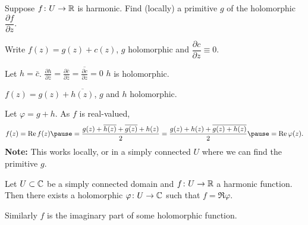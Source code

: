 \documentclass[10pt,aspectratio=169]{beamer}
\begin{document}
\begin{frame}
Suppose $f \colon U \to {\mathbb{R}}$ is harmonic.
\quad
\pause
Find (locally) a primitive $g$ of the holomorphic
$\dfrac{\partial f}{\partial z}$.

\medskip
\pause

Write
\quad $f(z) = g(z) + c(z)$, \quad
$g$ holomorphic and $\dfrac{\partial c}{\partial z} \equiv 0$.

\medskip
\pause

Let $h = \bar{c}$.
\pause
\wthus
$\displaystyle
\frac{\partial h}{\partial \bar{z}}
=
\frac{\partial \bar{c}}{\partial \bar{z}}
=
\overline{
\frac{\partial c}{\partial z}
}
=
0$
\pause
\wthus
$h$ is holomorphic.

\pause
\medskip
\thus \quad
$f(z) = g(z) + \overline{h(z)}$,
\quad
$g$ and $h$ holomorphic.

\medskip
\pause

Let $\varphi = g+h$.
\pause  \quad As $f$ is real-valued,
\[
f(z) = \Re f(z)
\pause
=
\frac{g(z) + \overline{h(z)} + \overline{g(z)}+h(z)}{2}
=
\frac{g(z) + h(z) + \overline{g(z)+h(z)}}{2}
\pause
=
\Re \varphi(z) .
\]
\pause
\textbf{Note:} This works locally, or in a simply
connected $U$ where we can find the primitive $g$.

\pause

\begin{proposition}
Let $U \subset {\mathbb{C}}$ be a simply connected domain and $f \colon U \to {\mathbb{R}}$ a
harmonic function.  Then there exists a holomorphic $\varphi \colon
U \to {\mathbb{C}}$ such that $f = \Re \varphi$.
\end{proposition}

\pause

Similarly $f$ is the imaginary part of some holomorphic function.

\medskip

\end{frame}
\end{document}
